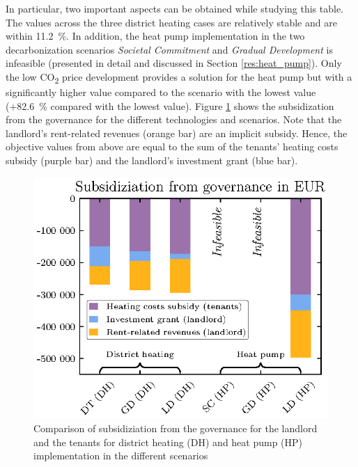 In particular, two important aspects can be obtained while studying this table. The values across the three district heating cases are relatively stable and are within \SI{11.2}{\%}. In addition, the heat pump implementation in the two decarbonization scenarios \textit{Societal Commitment} and \textit{Gradual Development} is infeasible (presented in detail and discussed in Section \ref{res:heat_pump}). Only the low CO\textsubscript{2} price development provides a solution for the heat pump but with a significantly higher value compared to the scenario with the lowest value (+\SI{82.6}{\%} compared with the lowest value). Figure \ref{fig:npv_comparison} shows the subsidization from the governance for the different technologies and scenarios. Note that the landlord's rent-related revenues (orange bar) are an implicit subsidy. Hence, the objective values from above are equal to the sum of the tenants' heating costs subsidy (purple bar) and the landlord's investment grant (blue bar). 

\begin{figure}[h]
	\centering
	\includegraphics[width=0.65\linewidth]{figures/4_Results/fig_npv_comparison/net_present_value.eps}
	\caption{Comparison of subsidiziation from the governance for the landlord and the tenants for district heating (DH) and heat pump (HP) implementation in the different scenarios}
	\label{fig:npv_comparison}
\end{figure}

